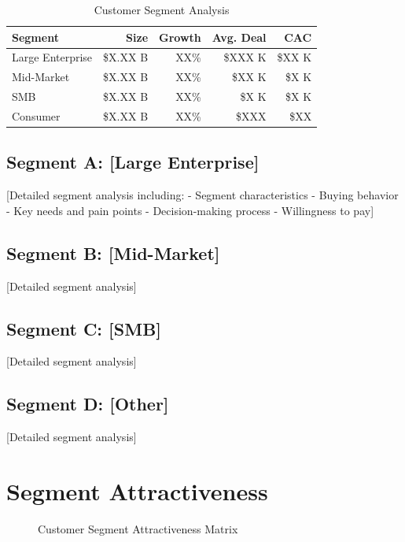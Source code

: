 \documentclass[11pt,letterpaper]{report}
\begin{document}
\begin{table}[htbp]
\centering
\caption{Customer Segment Analysis}
\begin{tabular}{@{}lrrrr@{}}
\toprule
\textbf{Segment} & \textbf{Size} & \textbf{Growth} & \textbf{Avg. Deal} & \textbf{CAC} \\
\midrule
Large Enterprise & \$X.XX B & XX\% & \$XXX K & \$XX K \\
\rowcolor{tablealt} Mid-Market & \$X.XX B & XX\% & \$XX K & \$X K \\
SMB & \$X.XX B & XX\% & \$X K & \$X K \\
\rowcolor{tablealt} Consumer & \$X.XX B & XX\% & \$XXX & \$XX \\
\bottomrule
\end{tabular}
\label{tab:customer_segments}
\end{table}

\subsection{Segment A: [Large Enterprise]}
[Detailed segment analysis including:
- Segment characteristics
- Buying behavior
- Key needs and pain points
- Decision-making process
- Willingness to pay]

\subsection{Segment B: [Mid-Market]}
[Detailed segment analysis]

\subsection{Segment C: [SMB]}
[Detailed segment analysis]

\subsection{Segment D: [Other]}
[Detailed segment analysis]

\section{Segment Attractiveness}


\begin{figure}[htbp]
\centering
\caption{Customer Segment Attractiveness Matrix}
\label{fig:segment_attractiveness}
\end{figure}
\end{document}
